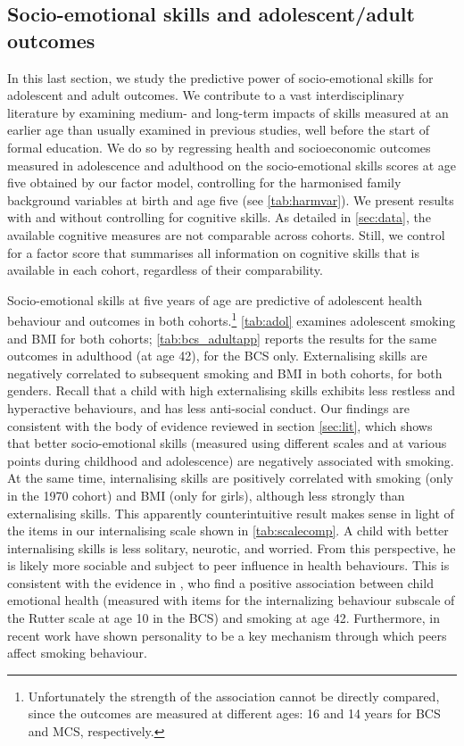 \subsection{Socio-emotional skills and adolescent/adult outcomes}

In this last section, we study the predictive power of socio-emotional skills for adolescent and adult outcomes. We contribute to a vast interdisciplinary literature by examining medium- and long-term impacts of skills measured at an earlier age than usually examined in previous studies, well before the start of formal education. We do so by regressing health and socioeconomic outcomes measured in adolescence and adulthood on the socio-emotional skills scores at age five obtained by our factor model, controlling for the harmonised family background variables at birth and age five (see \autoref{tab:harmvar}). We present results with and without controlling for cognitive skills. As detailed in \autoref{sec:data}, the available cognitive measures are not comparable across cohorts. Still, we control for a factor score that summarises all information on cognitive skills that is available in each cohort, regardless of their comparability.

Socio-emotional skills at five years of age are predictive of adolescent health behaviour and outcomes in both cohorts.\footnote{Unfortunately the strength of the association cannot be directly compared, since the outcomes are measured at different ages: 16 and 14 years for BCS and MCS, respectively.} \autoref{tab:adol} examines adolescent smoking and BMI for both cohorts; \autoref{tab:bcs_adultapp} reports the results for the same outcomes in adulthood (at age 42), for the BCS only. Externalising skills are negatively correlated to subsequent smoking and BMI in both cohorts, for both genders. Recall that a child with high externalising skills exhibits less restless and hyperactive behaviours, and has less anti-social conduct. Our findings are consistent with the body of evidence reviewed in section \ref{sec:lit}, which shows that better socio-emotional skills (measured using different scales and at various points during childhood and adolescence) are negatively associated with smoking. At the same time, internalising skills are positively correlated with smoking (only in the 1970 cohort) and BMI (only for girls), although less strongly than externalising skills. This apparently counterintuitive result makes sense in light of the items in our internalising scale shown in \autoref{tab:scalecomp}. A child with better internalising skills is less solitary, neurotic, and worried. From this perspective, he is likely more sociable and subject to peer influence in health behaviours. This is consistent with the evidence in \citet{goodman2015social}, who find a positive association between child emotional health (measured with items for the internalizing behaviour subscale of the Rutter scale at age 10 in the BCS) and smoking at age 42. Furthermore, in recent work \citet{hsieh2018smoking} have shown personality to be a key mechanism through which peers affect smoking behaviour.

